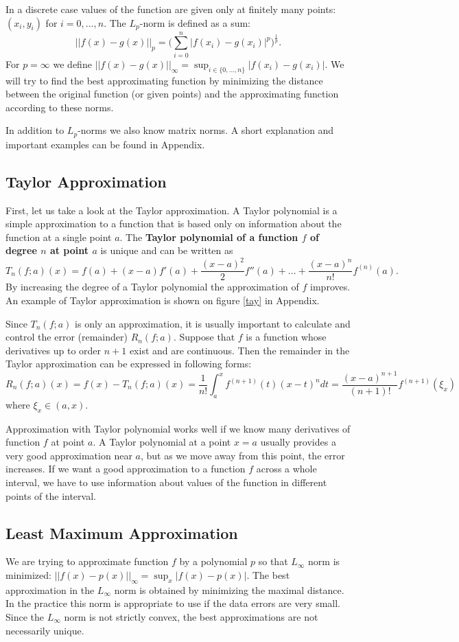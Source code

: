 \documentclass[a4paper,10pt]{article}
\begin{document}
In a discrete case values of the function are given only at finitely many points: $(x_i,y_i)$ for $i=0,...,n$. The $L_p$-norm is defined as a sum: $$||f(x)-g(x)||_p=\Big(\sum_{i=0}^n|f(x_i)-g(x_i)|^p\Big)^\frac{1}{p}.$$ For $p=\infty$ we define $||f(x)-g(x)||_\infty=\sup_{i\in\{0,...,n\}}|f(x_i)-g(x_i)|.$ \cite{lebesgue}
We will try to find the best approximating function by minimizing the distance between the original function (or given points) and the approximating function according to these norms.

In addition to $L_p$-norms we also know matrix norms. A short explanation and important examples can be found in Appendix.

\subsection{Taylor Approximation}
First, let us take a look at the Taylor approximation.
A Taylor polynomial is a simple approximation to a function that is based only on information about the function at a single point $a$.
The \textbf{Taylor polynomial of a function $f$ of degree $n$ at point $a$} is unique and can
be written as
$$T_n(f;a)(x)=f(a)+(x-a)f'(a)+\frac{(x-a)^2}{2}f''(a)+...+\frac{(x-a)^n}{n!}f^{(n)}(a).$$
By increasing the degree of a Taylor polynomial the approximation of $f$ improves. An example of Taylor approximation is shown on figure \ref{tay} in Appendix. \cite{globevnik}

Since $T_n(f;a)$ is only an approximation, it is usually important to calculate and control the error (remainder) $R_n(f;a)$.
Suppose that $f$ is a function whose derivatives up to order
$n + 1$ exist and are continuous. Then the remainder in the Taylor approximation can be expressed in following forms:
$$R_n(f;a)(x)=f(x)-T_n(f;a)(x)=\frac{1}{n!}\int_{a}^{x}f^{(n+1)}(t)(x-t)^ndt=\frac{(x-a)^{n+1}}{(n+1)!}f^{(n+1)}(\xi_x)$$
where $\xi_x \in (a,x)$. \cite{globevnik}

Approximation with Taylor polynomial works well if we know many derivatives of function $f$ at point $a$. A Taylor polynomial at a point $x = a$ usually provides a very good approximation near $a$, but as we move away from this point, the error increases.
If we want a good approximation to a function $f$ across a whole interval, we have to use information about values of the function in different points of the interval. \cite{globevnik}

\subsection{Least Maximum Approximation}
We are trying to approximate function $f$ by a polynomial $p$ so that $L_\infty$ norm is minimized: $||f(x)-p(x)||_{\infty}=\sup_x|f(x)-p(x)|$.
The best approximation in the
$L_\infty$ norm is obtained by minimizing the maximal distance.
In the practice this norm is appropriate to use if the data errors are very small.
Since the $L_\infty$ norm is not strictly convex, the best approximations are not necessarily unique. \cite{tomislav}
\end{document}

